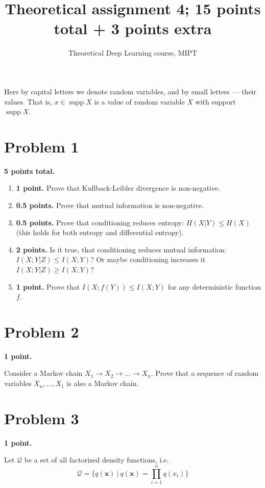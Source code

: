 \documentclass{article}
\title{Theoretical assignment 4; 15 points total + 3 points extra}
\author{Theoretical Deep Learning course, MIPT}
\date{}
\DeclareMathOperator{\supp}{supp}
\begin{document}
\maketitle

Here by capital letters we denote random variables, and by small letters --- their values.
That is, $x \in \supp{X}$ is a value of random variable $X$ with support $\supp{X}$.

\section*{Problem 1}

\textbf{5 points total.}

\begin{enumerate}
    \item \textbf{1 point.} Prove that Kullback-Leibler divergence is non-negative.
    \item \textbf{0.5 points.} Prove that mutual information is non-negative.
    \item \textbf{0.5 points.} Prove that conditioning reduces entropy: $H(X | Y) \leq H(X)$ (this holds for both entropy and differential entropy).
    \item \textbf{2 points.} Is it true, that conditioning reduces mutual information: $I(X; Y | Z) \leq I(X; Y)$? Or maybe conditioning increases it $I(X;Y|Z) \geq I(X;Y)$?
    \item \textbf{1 point.} Prove that $I(X; f(Y)) \leq I(X; Y)$ for any deterministic function $f$.
\end{enumerate}

\section*{Problem 2}

\textbf{1 point.}

Consider a Markov chain $X_1 \to X_2 \to \ldots \to X_n$.
Prove that a sequence of random variables $X_n, \ldots, X_1$ is also a Markov chain.

\section*{Problem 3}

\textbf{1 point.}

Let $\mathcal{Q}$ be a set of all factorized density functions, i.e.
\[
\mathcal{Q} = \big\{ q(\bm x)\ \big|\ q(\bm x) = \prod_{i=1}^n q(x_i) \big\}
\]
\end{document}
